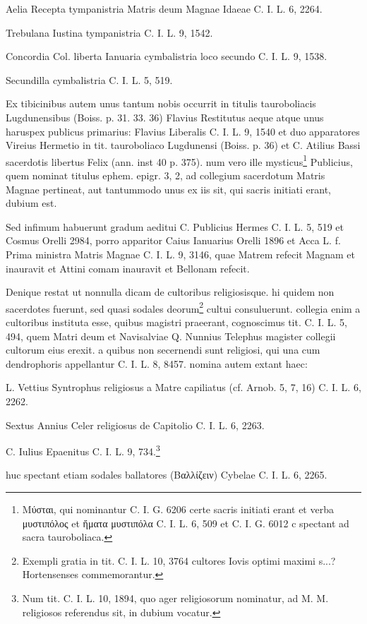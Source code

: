 \documentclass[a4paper, 11pt, oneside, polutonikogreek, german]{article}
\begin{document}
Aelia Recepta tympanistria Matris deum Magnae Idaeae C. I. L. 6, 2264.

Trebulana Iustina tympanistria C. I. L. 9, 1542.

Concordia Col. liberta Ianuaria cymbalistria loco secundo C. I. L. 9, 1538.

Secundilla cymbalistria C. I. L. 5, 519.

Ex tibicinibus autem unus tantum nobis occurrit in titulis tauroboliacis Lugdunensibus (Boiss. p. 31. 33. 36) Flavius Restitutus aeque atque unus haruspex publicus primarius: Flavius Liberalis C. I. L. 9, 1540 et duo apparatores Vireius Hermetio in tit. tauroboliaco Lugdunensi (Boiss. p. 36) et C. Atilius Bassi sacerdotis libertus Felix (ann. inst 40 p. 375). num vero ille mysticus\footnote{Μύσται, qui nominantur C. I. G. 6206 certe sacris initiati erant et verba μυστιπόλος et ἤματα μυστιπόλα C. I. L. 6, 509 et C. I. G. 6012 c spectant ad sacra tauroboliaca.} Publicius, quem nominat titulus ephem. epigr. 3, 2, ad collegium sacerdotum Matris Magnae pertineat, aut tantummodo unus ex iis sit, qui sacris initiati erant, dubium est.

Sed infimum habuerunt gradum aeditui C. Publicius Hermes C. I. L. 5, 519 et Cosmus Orelli 2984, porro apparitor Caius Ianuarius Orelli 1896 et Acca L. f. Prima ministra Matris Magnae C. I. L. 9, 3146, quae Matrem refecit Magnam et inauravit et Attini comam inauravit et Bellonam refecit.

Denique restat ut nonnulla dicam de cultoribus religiosisque. hi quidem non sacerdotes fuerunt, sed quasi sodales deorum\footnote{Exempli gratia in tit. C. I. L. 10, 3764 cultores Iovis optimi maximi s...? Hortensenses commemorantur.} cultui consuluerunt. collegia enim a cultoribus instituta esse, quibus magistri praeerant, cognoscimus tit. C. I. L. 5, 494, quem Matri deum et Navisalviae Q. Nunnius Telephus magister collegii cultorum eius erexit. a quibus non secernendi sunt religiosi, qui una cum dendrophoris appellantur C. I. L. 8, 8457. nomina autem extant haec:

L. Vettius Syntrophus religiosus a Matre capiliatus (cf. Arnob. 5, 7, 16) C. I. L. 6, 2262.

Sextus Annius Celer religiosus de Capitolio C. I. L. 6, 2263.

C. Iulius Epaenitus C. I. L. 9, 734.\footnote{Num tit. C. I. L. 10, 1894, quo ager religiosorum nominatur, ad M. M. religiosos referendus sit, in dubium vocatur.}

huc spectant etiam sodales ballatores (Βαλλίζειν) Cybelae C. I. L. 6, 2265.
\end{document}

